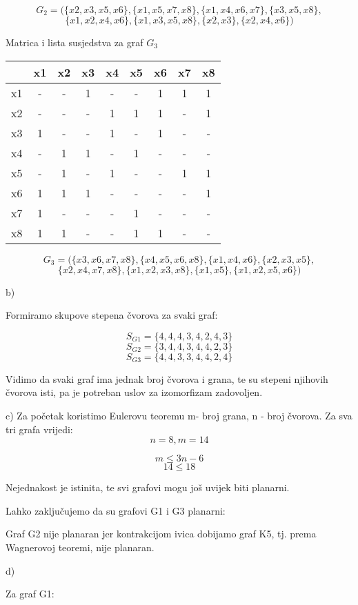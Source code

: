 \documentclass[12pt]{article}
\begin{document}
$$G_2 = (\{ x2, x3, x5, x6 \}, \{x1, x5, x7, x8\}, \{x1, x4, x6, x7\}, \{x3, x5, x8\}, $$
$$\{ x1, x2, x4, x6\}, \{x1, x3, x5, x8 \}, \{x2, x3\}, \{x2, x4, x6\})$$

Matrica i lista susjedstva za graf $G_3$

\begin{tabular}{ | c || c  | c | c | c | c | c | c | c | }
\hline
 & x1 & x2 & x3 & x4 & x5 & x6 & x7 & x8\\
 \hline
 \hline
x1 & - & - & 1 & - & - & 1 & 1 & 1\\
 \hline
x2 & - & - & - & 1 & 1 & 1 & - & 1\\
 \hline
x3 & 1 & - & - & 1 & - & 1 & - & -\\
 \hline
x4 & - & 1 & 1 & - & 1 & - & - & -\\
 \hline
x5 & - & 1 & - & 1 & - & - & 1 & 1\\
 \hline
x6 & 1 & 1 & 1 & - & - & - & - & 1\\
 \hline
x7 & 1 & - & - & - & 1 & - & - & -\\
 \hline
x8 & 1 & 1 & - & - & 1 & 1 & - & -\\
 \hline
\end{tabular}

$$G_3 = (\{ x3, x6, x7, x8\}, \{ x4, x5, x6, x8\}, \{x1, x4, x6\}, \{x2, x3, x5\}, $$
$$\{  x2, x4, x7, x8\}, \{x1, x2, x3, x8 \}, \{x1, x5\}, \{x1, x2, x5, x6\})$$

b)

Formiramo skupove stepena čvorova za svaki graf:

$$S_{G1} = \{ 4, 4, 4, 3, 4, 2, 4, 3\}$$
$$S_{G2} = \{ 3, 4, 4, 3, 4, 4, 2, 3\}$$
$$S_{G3} = \{4, 4, 3, 3, 4, 4, 2, 4\}$$

Vidimo da svaki graf ima jednak broj čvorova i grana, te su stepeni njihovih čvorova isti, pa je potreban uslov za izomorfizam zadovoljen.

c)
Za početak koristimo Eulerovu teoremu m- broj grana, n - broj čvorova.
Za sva tri grafa vrijedi:
$$n = 8, m = 14$$ 

$$m \leq 3n - 6$$
$$ 14 \leq 18$$

Nejednakost je istinita, te svi grafovi mogu još uvijek biti planarni.

Lahko zaključujemo da su grafovi G1 i G3 planarni:


Graf G2 nije planaran jer kontrakcijom ivica dobijamo graf K5, tj. prema Wagnerovoj teoremi, nije planaran.

d)

Za graf G1:
\end{document}
